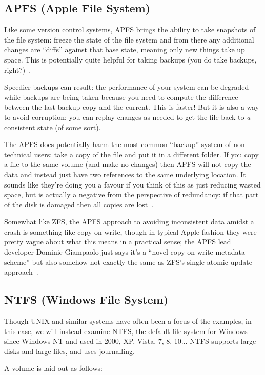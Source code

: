 \subsection*{APFS (Apple File System)}

Like some version control systems, APFS brings the ability to take snapshots of the file system: freeze the state of the file system and from there any additional changes are ``diffs'' against that base state, meaning only new things take up space. This is potentially quite helpful for taking backups (you do take backups, right?)~\cite{apfs}.

Speedier backups can result: the performance of your system can be degraded while backups are being taken because you need to compute the difference between the last backup copy and the current. This is faster! But it is also a way to avoid corruption: you can replay changes as needed to get the file back to \textit{a} consistent state (of some sort).

The APFS does potentially harm the most common ``backup'' system of non-technical users: take a copy of the file and put it in a different folder. If you copy a file to the same volume (and make no changes) then APFS will not copy the data and instead just have two references to the same underlying location. It sounds like they're doing you a favour if you think of this as just reducing wasted space, but is actually a negative from the perspective of redundancy: if that part of the disk is damaged then all copies are lost~\cite{apfs}.

Somewhat like ZFS, the APFS approach to avoiding inconsistent data amidst a crash is something like copy-on-write, though in typical Apple fashion they were pretty vague about what this means in a practical sense; the APFS lead developer Dominic Giampaolo just says it's a ``novel copy-on-write metadata scheme'' but also somehow not exactly the same as ZFS's single-atomic-update approach~\cite{apfs}.

\subsection*{NTFS (Windows File System)}
Though UNIX and similar systems have often been a focus of the examples, in this case, we will instead examine NTFS, the default file system for Windows since Windows NT and used in 2000, XP, Vista, 7, 8, 10... NTFS supports large disks and large files, and uses journalling.

A volume is laid out as follows:

